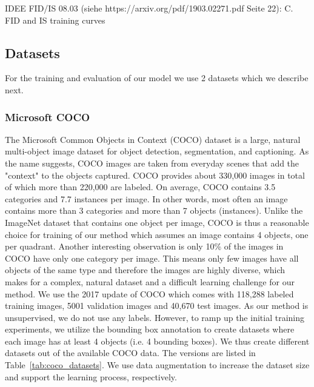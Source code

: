\documentclass[12pt,a4paper]{article}
\begin{document}
\par IDEE FID/IS 08.03 (siehe https://arxiv.org/pdf/1903.02271.pdf Seite 22): C. FID and IS training curves
    
\subsection{Datasets}
For the training and evaluation of our model we use 2 datasets which we describe next.

\subsubsection{Microsoft COCO}
The Microsoft Common Objects in Context (COCO) dataset \cite{MsCoco} is a large, natural multi-object image dataset for object detection, segmentation, and captioning.
As the name suggests, COCO images are taken from everyday scenes that add the "context" to the objects captured. COCO provides about 330,000 images in total of which more than 220,000 are labeled. On average, COCO contains 3.5 categories and 7.7 instances per image. In other words, most often an image contains more than 3 categories and more than 7 objects (instances). Unlike the ImageNet dataset that contains one object per image, COCO is thus a reasonable choice for training of our method which assumes an image contains 4 objects, one per quadrant. Another interesting observation is only 10\% of the images in COCO have only one category per image. This means only few images have all objects of the same type and therefore the images are highly diverse, which makes for a complex, natural dataset and a difficult learning challenge for our method. We use the 2017 update of COCO which comes with 118,288 labeled training images, 5001 validation images and 40,670 test images. As our method is unsupervised, we do not use any labels. However, to ramp up the initial training experiments, we utilize the bounding box annotation to create datasets where each image has at least 4 objects (i.e. 4 bounding boxes). We thus create different datasets out of the available COCO data. The versions are listed in Table~\ref{tab:coco_datasets}. We use data augmentation to increase the dataset size and support the learning process, respectively.
\end{document}
